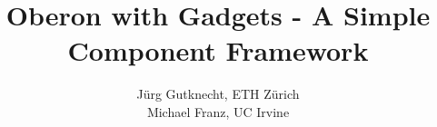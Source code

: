 

\setlength{\parindent}{0pt}
\setlength{\parskip}{0pt}
\setlength{\textheight}{19.3cm}
\setlength{\textwidth}{12.2cm}
\addtolength{\evensidemargin}{-0.7cm}
\addtolength{\oddsidemargin}{-1.2cm}
\newcommand{\lowstar}{\raisebox{-0.6ex}{*}}      %
\newcommand{\ein}{\hspace*{1em}}                 %
\newcommand{\bk}{(\lowstar}                      %
\newcommand{\ek}{\lowstar)}                      %
\newcommand{\corr}{$ \leftrightarrow $}          %
\newcommand{\vstitel}[1]{{\bigskip\medskip \bf #1 \medskip}}   %
\newcommand{\vpf}{$ \,\uparrow \,$}              %
\newcommand\td{\raisebox{-0.6ex}{\tt \char126}}  %

\newenvironment{pg}                              %
   {\small
    \begin{tabbing}
    \hspace*{0.2cm} \= \hspace{0.2cm} \=
    \hspace{0.2cm} \= \hspace{0.2cm} \=
    \hspace{0.2cm} \= \hspace{0.2cm} \=
    \hspace{0.2cm} \= \hspace{0.2cm} \kill }
    {\end{tabbing}}


\title{\addtolength{\rightskip}{-0.9cm}
       \bf Oberon with Gadgets - A Simple Component Framework}

\author{J\"urg Gutknecht, ETH Z\"urich\\ Michael Franz, UC Irvine}
\date{}



\maketitle

